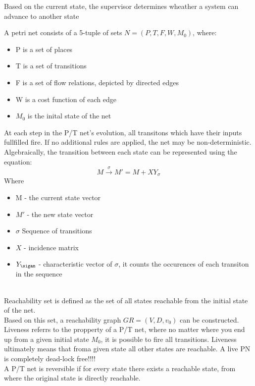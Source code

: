 {
    Based on the current state, the supervisor determines wheather a system can advance to another state
}


{
    A petri net consists of a 5-tuple of sets $N = \left( P,T,F,W,M_0 \right)$, where:
    \begin{itemize}
            \item P is a set of places
            \item T is a set of transitions
            \item F is a set of flow relations, depicted by directed edges
            \item W is a cost function of each edge
            \item $M_0$ is the inital state of the net
    \end{itemize}
    At each step in the P/T net's evolution, all transitons which have their inputs fullfilled fire. If no additional rules are applied, the net
    may be non-deterministic.
    Algebraically, the transition between each state can be represented using the equation:
    \begin{equation}
        M \xrightarrow{\sigma} M' = M+XY_\sigma
    \end{equation}
Where
    \begin{itemize}
            \item  M - the current state vector
            \item $M'$ - the new state vector
            \item $\sigma$ Sequence of transitions
            \item  $X$ - incidence matrix
            \item  $Y_\sigam$ - characteristic vector of  $\sigma$, it counts the occurences of each transiton in the sequence
            
    \end{itemize}

   \\
   Reachability set is defined as the set of all states reachable from the initial state of the net.\\
   Based on this set, a reachability graph $GR = (V,D,v_0)$ can be constructed.
\\
Liveness referrs to the propperty of a P/T net, where no matter where you end up from a given initial state $M_0$, it is possible to fire all transitions. Liveness ultimately means that froma given state all other states are reachable.
A live PN is completely dead-lock free!!!!
\\
A P/T net is reversible if for every state there exists a reachable state, from where the original state is directly reachable.
}



